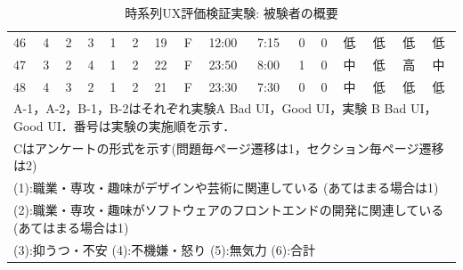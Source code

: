 \begin{table}[htbp]
{\begin{tabular}{llllllllllllllll}
46                  & 4                    & 2                    & 3                    & 1                    & 2                  & 19                     & F                   & 12:00                 & 7:15                  & 0                    & 0                    & 低     & 低     & 低     & 低     \\
47                  & 3                    & 2                    & 4                    & 1                    & 2                  & 22                     & F                   & 23:50                 & 8:00                  & 1                    & 0                    & 中     & 低     & 高     & 中     \\
48                  & 4                    & 3                    & 2                    & 1                    & 2                  & 21                     & F                   & 23:30                 & 7:30                  & 0                    & 0                    & 中     & 低     & 低     & 低     \\ \hline
\multicolumn{16}{l}{A-1，A-2，B-1，B-2はそれぞれ実験A Bad UI，Good UI，実験 B Bad UI，Good UI．番号は実験の実施順を示す．}                                                                                                                                                                                                                     \\
\multicolumn{16}{l}{Cはアンケートの形式を示す(問題毎ページ遷移は1，セクション毎ページ遷移は2)}                                                                                                                                                                                                                                                      \\
\multicolumn{16}{l}{(1):職業・専攻・趣味がデザインや芸術に関連している (あてはまる場合は1)}                                                                                                                                                                                                                                                      \\
\multicolumn{16}{l}{(2):職業・専攻・趣味がソフトウェアのフロントエンドの開発に関連している(あてはまる場合は1)}                                                                                                                                                                                                                                             \\
\multicolumn{16}{l}{(3):抑うつ・不安 (4):不機嫌・怒り (5):無気力 (6):合計}                                                                                                                                                                                                                                                        
\end{tabular}
}
\caption{時系列UX評価検証実験: 被験者の概要}
\label{table:exp2result1}
\end{table}

